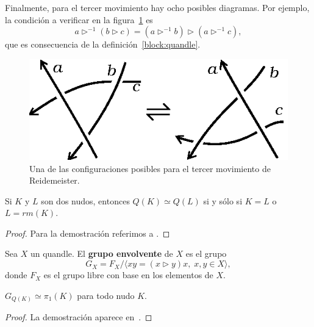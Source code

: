 \documentclass[graybox]{svmult}
\begin{document}
	Finalmente, para el tercer movimiento hay ocho posibles diagramas. Por
	ejemplo, la condición a verificar en la figura~\ref{fig:oriented_R3a} es
    \begin{equation*}
        a\triangleright^{-1}(b\triangleright c)=(a\triangleright^{-1}b)\triangleright(a\triangleright^{-1}c),
    \end{equation*}
    que es consecuencia de la definición~\ref{block:quandle}.

    \begin{figure}[h]
		\centering
        \includegraphics[scale=0.6]{images/oriented_R3a}
        \caption{Una de las configuraciones posibles para el tercer movimiento de Reidemeister.}
        \label{fig:oriented_R3a}
    \end{figure}

	\begin{theorem}[Matveev]
		Si $K$ y $L$ son dos nudos, entonces 
		$Q(K)\simeq Q(L)$ si y sólo si $K=L$ o $L=rm(K)$.  
	\end{theorem}

	\begin{proof}
	Para la demostración referimos a \cite{MR672410}.
	\end{proof}

	Sea $X$ un quandle. El \textbf{grupo envolvente} de $X$ es el grupo
	\[
		G_X=F_X/\langle xy=(x\triangleright y)x,\;x,y\in X\rangle,
	\]
	donde $F_X$ es el grupo libre con base en los elementos de $X$.

	\begin{theorem}[Joyce]
		$G_{Q(K)}\simeq\pi_1(K)$ para todo nudo $K$. 
	\end{theorem}

	\begin{proof}
		La demostración aparece en~\cite{MR638121}.
	\end{proof}
\end{document}
